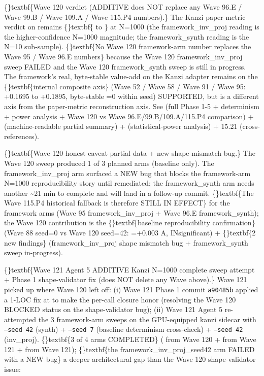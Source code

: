 \documentclass{article}
\begin{document}
\{\}textbf\{Wave 120 verdict (ADDITIVE  does NOT replace any Wave 96.E / Wave 99.B / Wave 109.A / Wave 115.P4 numbers).\} The Kanzi paper-metric verdict on  remains \{\}textbf\{ to \} at N=1000 (the framework\_inv\_proj reading is the higher-confidence N=1000 magnitude; the framework\_synth reading is the N=10 sub-sample). \{\}textbf\{No Wave 120 framework-arm number replaces the Wave 95 / Wave 96.E numbers\} because the Wave 120 framework\_inv\_proj sweep FAILED and the Wave 120 framework\_synth sweep is still in progress. The framework's real, byte-stable value-add on the Kanzi adapter remains on the \{\}textbf\{internal composite axis\} (Wave 52 / Wave 58 / Wave 91 / Wave 95: +0.1695 to +0.1895, byte-stable =0 within seed)  SUPPORTED, but is a different axis from the paper-metric reconstruction axis. See  (full Phase 1-5 + determinism + power analysis + Wave 120 vs Wave 96.E/99.B/109.A/115.P4 comparison) +  (machine-readable partial summary) +  (statistical-power analysis) +  15.21 (cross-references).

\{\}textbf\{Wave 120 honest caveat  partial data + new shape-mismatch bug.\} The Wave 120 sweep produced 1 of 3 planned arms (baseline only). The framework\_inv\_proj arm surfaced a NEW bug that blocks the framework-arm N=1000 reproducibility story until remediated; the framework\_synth arm needs another \textasciitilde{}21 min to complete and will land in a follow-up commit. \{\}textbf\{The Wave 115.P4 historical fallback is therefore STILL IN EFFECT\} for the framework arms (Wave 95 framework\_inv\_proj + Wave 96.E framework\_synth); the Wave 120 contribution is the \{\}textbf\{baseline reproducibility confirmation\} (Wave 88 seed=0 vs Wave 120 seed=42: =+0.003 A, INsignificant) + \{\}textbf\{2 new findings\} (framework\_inv\_proj shape mismatch bug + framework\_synth sweep in-progress).

\{\}textbf\{Wave 121 Agent 5 ADDITIVE  Kanzi N=1000 complete sweep attempt + Phase 1 shape-validator fix (does NOT delete any Wave above).\} Wave 121 picked up where Wave 120 left off: (i) Wave 121 Phase 1 commit \texttt{a90485b} applied a 1-LOC fix at  to make the per-call  closure honor  (resolving the Wave 120 BLOCKED status on the shape-validator bug); (ii) Wave 121 Agent 5 re-attempted the 3 framework-arm sweeps on the GPU-equipped kanzi sidecar with \texttt{--seed 42} (synth) + \texttt{--seed 7} (baseline determinism cross-check) + \texttt{--seed 42} (inv\_proj). \{\}textbf\{3 of 4 arms COMPLETED\} ( from Wave 120 +  from Wave 121 +  from Wave 121); \{\}textbf\{the framework\_inv\_proj\_seed42 arm FAILED with a NEW bug\}  a deeper architectural gap than the Wave 120 shape-validator issue:
\end{document}

